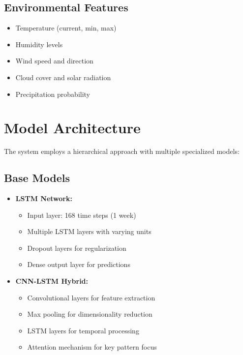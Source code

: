 \documentclass[12pt,a4paper]{report}
\begin{document}
\subsection{Environmental Features}
\begin{itemize}
\item Temperature (current, min, max)
\item Humidity levels
\item Wind speed and direction
\item Cloud cover and solar radiation
\item Precipitation probability
\end{itemize}

\section{Model Architecture}
The system employs a hierarchical approach with multiple specialized models:

\subsection{Base Models}
\begin{itemize}
\item \textbf{LSTM Network:}
  \begin{itemize}
    \item Input layer: 168 time steps (1 week)
    \item Multiple LSTM layers with varying units
    \item Dropout layers for regularization
    \item Dense output layer for predictions
  \end{itemize}

\item \textbf{CNN-LSTM Hybrid:}
  \begin{itemize}
    \item Convolutional layers for feature extraction
    \item Max pooling for dimensionality reduction
    \item LSTM layers for temporal processing
    \item Attention mechanism for key pattern focus
  \end{itemize}
\end{itemize}
\end{document}
